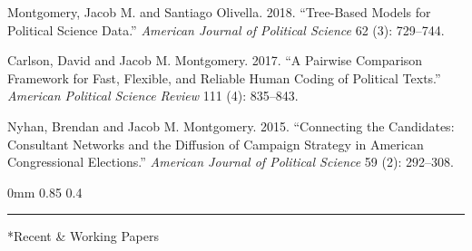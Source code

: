 \documentclass[10pt]{article}
\makeatletter
\renewcommand{\section}{\@startsection{section}{12}
{0mm}
{0.85\baselineskip}
{0.4\baselineskip}
{\large\bfseries\scshape\hrule\vspace{0.45\baselineskip}}}
\newenvironment{CVpub}
  {\begin{list}{}
    {\setlength{\labelwidth}{0pt}
    \setlength{\leftmargin}{14pt}
    \setlength{\itemindent}{-14pt}
    \setlength{\itemsep}{2pt}
    \setlength{\parsep}{0pt}
  }}
  {\end{list}}
\makeatother
\begin{document}
\begin{CVpub}
\item[] Montgomery, Jacob M. and Santiago Olivella. 2018. ``Tree-Based Models for Political Science Data.'' \textit{American Journal of Political Science} 62 (3): 729--744.

\item[] Carlson, David and Jacob M. Montgomery. 2017. ``A Pairwise Comparison Framework for Fast, Flexible, and Reliable Human Coding of Political Texts.'' \textit{American Political Science Review} 111 (4): 835--843.

\item[] Nyhan, Brendan and Jacob M. Montgomery. 2015. ``Connecting the Candidates: Consultant Networks and the Diffusion of Campaign Strategy in American Congressional Elections.'' \textit{American Journal of Political Science} 59 (2): 292--308.

\end{CVpub}


\section*{Recent \& Working Papers}
\end{document}
